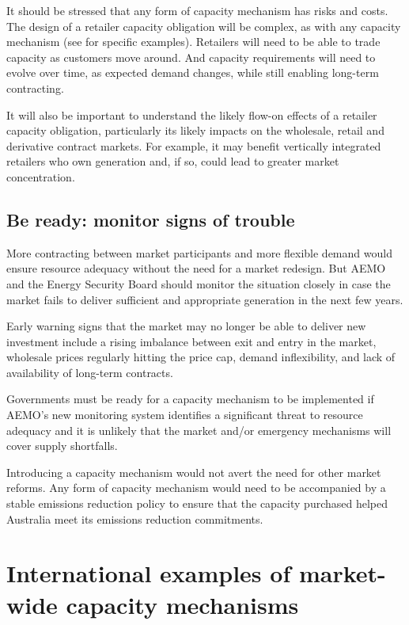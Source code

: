 \documentclass[FrontPage]{grattan}
\begin{document}
It should be stressed that any form of capacity mechanism has risks and costs. The design of a retailer capacity obligation will be complex, as with any capacity mechanism (see  for specific examples). Retailers will need to be able to trade capacity as customers move around. And capacity requirements will need to evolve over time, as expected demand changes, while still enabling long-term contracting.

It will also be important to understand the likely flow-on effects of a retailer capacity obligation, particularly its likely impacts on the wholesale, retail and derivative contract markets. For example, it may benefit vertically integrated retailers who own generation and, if so, could lead to greater market concentration.


\section{Be ready: monitor signs of trouble}\label{sec:monitor-signs-of-trouble}
More contracting between market participants and more flexible demand would ensure resource adequacy without the need for a market redesign. But AEMO and the Energy Security Board should monitor the situation closely in case the market fails to deliver sufficient and appropriate generation in the next few years.

Early warning signs that the market may no longer be able to deliver new investment include a rising imbalance between exit and entry in the market, wholesale prices regularly hitting the price cap, demand inflexibility, and lack of availability of long-term contracts.

Governments must be ready for a capacity mechanism to be implemented if AEMO's new monitoring system identifies a significant threat to resource adequacy and it is unlikely that the market and/or emergency mechanisms will cover supply shortfalls.

Introducing a capacity mechanism would not avert the need for other market reforms. Any form of capacity mechanism would need to be accompanied by a stable emissions reduction policy to ensure that the capacity purchased helped Australia meet its emissions reduction commitments.




\appendix

\chapter{International examples of market-wide capacity mechanisms}\label{chap:appendix-international}
\end{document}
